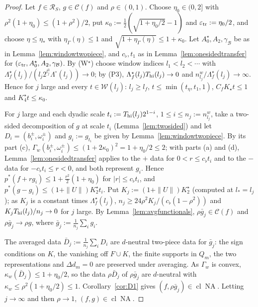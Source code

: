 \documentclass[10pt]{amsart}
\theoremstyle{definition}
\theoremstyle{remark}
\newcommand{\NA}{\operatorname{NA}}
\newcommand{\Cset}{\mathcal C}
\newcommand{\cl}{\operatorname{cl}}
\begin{document}
\begin{proof}
Let $f\in\mathcal R_S$, $g\in\Cset(f)$ and $\rho\in(0,1)$.  Choose
$\eta_0\in(0,2]$ with $\rho^2(1+\eta_0)\le(1+\rho^2)/2$, put
$\kappa_0:=\frac12(\sqrt{1+\eta_0/2}-1)$ and $\varepsilon_{\rm tr}:=
\eta_0/2$, and choose $\eta\le\eta_*$ with $\eta_\Gamma(\eta)\le1$ and
$\sqrt{1+\eta_\Gamma(\eta)}\le1+\kappa_0$.  Let $A^\star_0,A_2,
\gamma_{\mathcal B}$ be as in Lemma~\ref{lem:windowtwopiece}, and
$c_\flat,t_1$ as in Lemma~\ref{lem:onesidedtransfer} for
$(\varepsilon_{\rm tr},A^\star_0,A_2,\gamma_{\mathcal B})$.  By (W$^\star$)
choose window indices $l_1<l_2<\cdots$ with
$\Lambda^\star_f(l_j)/(l_j2^{l_j^3}\Lambda^\circ(l_j))\to0$; by (P3),
$\Lambda^\star_f(l_j)T_{\rm hi}(l_j)\to0$ and $n^w_{l_j}/\Lambda^\star_f
(l_j)\to\infty$.  Hence for $j$ large and every $t\in\mathcal W(l_j)$:
$l_j\ge l_f$, $t\le\min(t_\eta,t_1,1)$, $C_fK_\star t\le1$ and
$K^\star_4t\le\kappa_0$.

For $j$ large and each dyadic scale $t_i:=T_{\rm hi}(l_j)2^{1-i}$, $1\le
i\le n_j:=n^w_{l_j}$, take a two-sided decomposition of $g$ at scale $t_i$
(Lemma~\ref{lem:twosided}) and let $D_i=(b^\pm_i,\omega^\pm_i)$ and
$g_i:=g_{t_i}$ be given by Lemma~\ref{lem:windowtwopiece}.  By its part (c),
$\Gamma_w(b^\pm_i,\omega^\pm_i)\le(1+2\kappa_0)^2=1+\eta_0/2\le2$; with parts
(a) and (d), Lemma~\ref{lem:onesidedtransfer} applies to the $+$ data for
$0<r\le c_\flat t_i$ and to the $-$ data for $-c_\flat t_i\le r<0$, and both
represent $g_i$.  Hence $p^*(f+rg_i)\le1+\frac{r^2}2(1+\eta_0)$ for
$|r|\le c_\flat t_i$, and $p^*(g-g_i)\le(1+\|U\|)K^\star_2t_i$.  Put
$K_j:=(1+\|U\|)K^\star_2$ (computed at $l_*=l_j$); as $K_j$ is a constant
times $\Lambda^\star_f(l_j)$, $n_j\ge24\rho^2K_j/(c_\flat(1-\rho^2))$ and
$K_jT_{\rm hi}(l_j)/n_j\to0$ for $j$ large.  By
Lemma~\ref{lem:avgfunctionals}, $\rho\bar g_j\in\Cset(f)$ and
$\rho\bar g_j\to\rho g$, where $\bar g_j:=\frac1{n_j}\sum_ig_i$.

The averaged data $\bar D_j:=\frac1{n_j}\sum_iD_i$ are $d$-neutral two-piece
data for $\bar g_j$: the sign conditions on $K$, the vanishing off $F\cup
K$, the finite supports in $Q_m$, the two representations and $\Delta d_m=0$
are preserved under averaging.  As $\Gamma_w$ is convex,
$\kappa_w(\bar D_j)\le1+\eta_0/2$, so the data $\rho\bar D_j$ of
$\rho\bar g_j$ are $d$-neutral with $\kappa_w\le\rho^2(1+\eta_0/2)\le1$.
Corollary~\ref{cor:D1} gives $(f,\rho\bar g_j)\in\cl\NA$.  Letting
$j\to\infty$ and then $\rho\to1$, $(f,g)\in\cl\NA$.
\end{proof}
\end{document}
